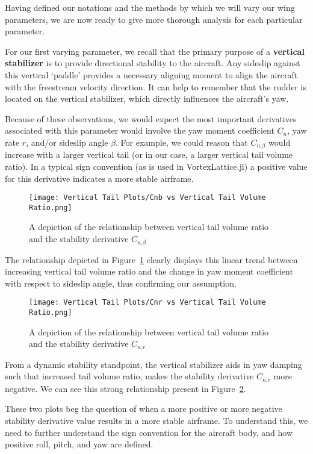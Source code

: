 \documentclass{article}
\begin{document}
Having defined our notations and the methods by which we will vary our wing parameters, we are now ready to give more thorough analysis for each particular parameter.

\bigskip

For our first varying parameter, we recall that the primary purpose of a \textbf{vertical stabilizer} is to provide directional stability to the aircraft.
Any sideslip against this vertical `paddle' provides a necessary aligning moment to align the aircraft with the freestream velocity direction.
It can help to remember that the rudder is located on the vertical stabilizer, which directly influences the aircraft's yaw.

Because of these observations, we would expect the most important derivatives associated with this parameter would involve the yaw moment coefficient $C_n$, yaw rate $r$, and/or sideslip angle $\beta$.
For example, we could reason that $C_{n\text{,}\beta}$ would increase with a larger vertical tail (or in our case, a larger vertical tail volume ratio).
In a typical sign convention (as is used in VortexLattice.jl) a positive value for this derivative indicates a more stable airframe.
\begin{figure}[H]
    \centering
    \texttt{[image: Vertical Tail Plots/Cnb vs Vertical Tail Volume Ratio.png]}
    \caption{A depiction of the relationship between vertical tail volume ratio and the stability derivative $C_{n \text{,} \beta}$}\label{fig:cnb}
\end{figure}
The relationship depicted in Figure~\ref{fig:cnb} clearly displays this linear trend between increasing vertical tail volume ratio and the change in yaw moment coefficient with respect to sideslip angle, thus confirming our assumption.

\begin{figure}[H]
    \centering
    \texttt{[image: Vertical Tail Plots/Cnr vs Vertical Tail Volume Ratio.png]}
    \caption{A depiction of the relationship between vertical tail volume ratio and the stability derivative $C_{n \text{,} r}$\label{fig:cnr}}
\end{figure}
From a dynamic stability standpoint, the vertical stabilizer aids in yaw damping such that increased tail volume ratio, makes the stability derivative $C_{n\text{,}r}$ more negative.
We can see this strong relationship present in Figure~\ref{fig:cnr}.

These two plots beg the question of when a more positive or more negative stability derivative value results in a more stable airframe.
To understand this, we need to further understand the sign convention for the aircraft body, and how positive roll, pitch, and yaw are defined.
\end{document}
